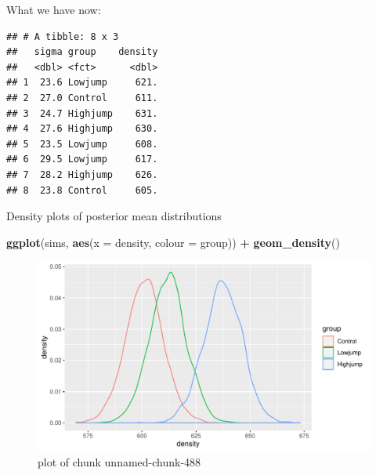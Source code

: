 \documentclass[
  ignorenonframetext,
]{beamer}
\newenvironment{Shaded}{\begin{snugshade}}{\end{snugshade}}
\newcommand{\DataTypeTok}[1]{\textcolor[rgb]{0.13,0.29,0.53}{#1}}
\newcommand{\DecValTok}[1]{\textcolor[rgb]{0.00,0.00,0.81}{#1}}
\newcommand{\KeywordTok}[1]{\textcolor[rgb]{0.13,0.29,0.53}{\textbf{#1}}}
\newcommand{\NormalTok}[1]{#1}
\newcommand{\OperatorTok}[1]{\textcolor[rgb]{0.81,0.36,0.00}{\textbf{#1}}}
\newcommand{\StringTok}[1]{\textcolor[rgb]{0.31,0.60,0.02}{#1}}
\begin{document}
\begin{frame}[fragile]{What we have now:}
\protect\hypertarget{what-we-have-now}{}

\begin{Shaded}
\end{Shaded}

\begin{verbatim}
## # A tibble: 8 x 3
##   sigma group    density
##   <dbl> <fct>      <dbl>
## 1  23.6 Lowjump     621.
## 2  27.0 Control     611.
## 3  24.7 Highjump    631.
## 4  27.6 Highjump    630.
## 5  23.5 Lowjump     608.
## 6  29.5 Lowjump     617.
## 7  28.2 Highjump    626.
## 8  23.8 Control     605.
\end{verbatim}

\end{frame}

\begin{frame}[fragile]{Density plots of posterior mean distributions}
\protect\hypertarget{density-plots-of-posterior-mean-distributions}{}

\begin{Shaded}
\begin{Highlighting}[]
\KeywordTok{ggplot}\NormalTok{(sims, }\KeywordTok{aes}\NormalTok{(}\DataTypeTok{x =}\NormalTok{ density, }\DataTypeTok{colour =}\NormalTok{ group)) }\OperatorTok{+}\StringTok{ }\KeywordTok{geom_density}\NormalTok{()}
\end{Highlighting}
\end{Shaded}

\begin{figure}
\centering
\includegraphics{figure/unnamed-chunk-488-1.pdf}
\caption{plot of chunk unnamed-chunk-488}
\end{figure}

\end{frame}
\end{document}
